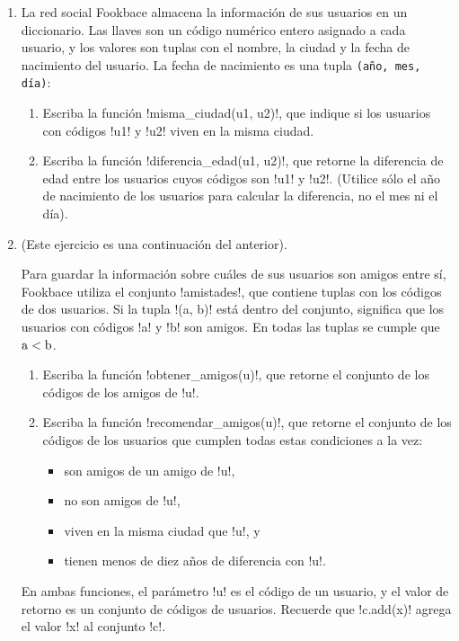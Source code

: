 \documentclass[11pt,spanish]{article}
\newcommand{\pond}[1]{[{\small\textbf{#1\%}}]}
\begin{document}
\begin{enumerate}[font=\Large\bfseries]
    \newpage
    \item
      \pond{25}
      La red social Fookbace almacena la información de sus usuarios
      en un diccionario.
      Las llaves son un código numérico entero asignado a cada usuario, y
      los valores son tuplas con el nombre, la ciudad y la fecha de nacimiento del usuario.
      La fecha de nacimiento es una tupla \texttt{(año, mes, día)}:
      
      \begin{enumerate}
        \item Escriba la función \li!misma_ciudad(u1, u2)!,
          que indique si los usuarios con códigos \li!u1! y \li!u2!
          viven en la misma ciudad.
          
        \item Escriba la función \li!diferencia_edad(u1, u2)!,
          que retorne la diferencia de edad entre los usuarios
          cuyos códigos son \li!u1! y \li!u2!.
          (Utilice sólo el año de nacimiento de los usuarios
          para calcular la diferencia, no el mes ni el día).
          
      \end{enumerate}

    \newpage
    \item
      \pond{25}
      (Este ejercicio es una continuación del anterior).

      Para guardar la información sobre cuáles de sus usuarios son amigos entre sí,
      Fookbace utiliza el conjunto \li!amistades!,
      que contiene tuplas con los códigos de dos usuarios.
      Si la tupla \li!(a, b)! está dentro del conjunto,
      significa que los usuarios con códigos \li!a! y \li!b! son amigos.
      En todas las tuplas se cumple que \(\text{\li!a!} < \text{\li!b!}\).
      
      \begin{enumerate}
        \item Escriba la función \li!obtener_amigos(u)!,
          que retorne el conjunto de los códigos
          de los amigos de \li!u!.
        \item Escriba la función \li!recomendar_amigos(u)!,
          que retorne el conjunto de los códigos
          de los usuarios que cumplen todas estas condiciones a la vez:
          \begin{itemize}
            \item son amigos de un amigo de \li!u!,
            \item no son amigos de \li!u!,
            \item viven en la misma ciudad que \li!u!, y
            \item tienen menos de diez años de diferencia con \li!u!.
          \end{itemize}
      \end{enumerate}
      En ambas funciones,
      el parámetro \li!u! es el código de un usuario,
      y el valor de retorno es un conjunto de códigos de usuarios.
      Recuerde que \li!c.add(x)! agrega el valor \li!x! al conjunto \li!c!.

  \end{enumerate}
\end{document}

